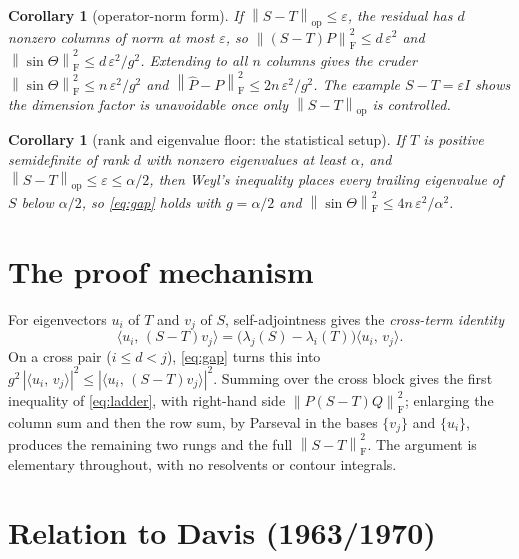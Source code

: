 \documentclass[11pt]{article}
\newcommand{\norm}[1]{\left\lVert #1\right\rVert}
\newcommand{\eps}{\varepsilon}
\newcommand{\F}{\mathrm{F}}
\newcommand{\op}{\mathrm{op}}
\newcommand{\inner}[2]{\langle #1,\,#2\rangle}
\newcommand{\gap}{g}
\newcommand{\sinT}{\sin\Theta}
\newtheorem{corollary}[theorem]{Corollary}
\theoremstyle{remark}
\begin{document}
\begin{corollary}[operator-norm form]\label{cor:opnorm}
If $\norm{S-T}_{\op}\le\eps$, the residual has $d$ nonzero columns of norm at most
$\eps$, so $\norm{(S-T)P}_{\F}^2\le d\,\eps^2$ and
$\norm{\sinT}_{\F}^2\le d\,\eps^2/\gap^2$.  Extending to all $n$ columns gives the
cruder $\norm{\sinT}_{\F}^2\le n\,\eps^2/\gap^2$ and
$\norm{\widehat P-P}_{\F}^2\le 2n\,\eps^2/\gap^2$.  The example $S-T=\eps I$ shows
the dimension factor is unavoidable once only $\norm{S-T}_{\op}$ is controlled.
\end{corollary}

\begin{corollary}[rank and eigenvalue floor: the statistical setup]\label{cor:floor}
If $T$ is positive semidefinite of rank $d$ with nonzero eigenvalues at least
$\alpha$, and $\norm{S-T}_{\op}\le\eps\le\alpha/2$, then Weyl's inequality places
every trailing eigenvalue of $S$ below $\alpha/2$, so \eqref{eq:gap} holds with
$\gap=\alpha/2$ and $\norm{\sinT}_{\F}^2\le 4n\,\eps^2/\alpha^2$.
\end{corollary}

\section{The proof mechanism}

For eigenvectors $u_i$ of $T$ and $v_j$ of $S$, self-adjointness gives the
\emph{cross-term identity}
\begin{equation}\label{eq:cross}
  \inner{u_i}{(S-T)v_j}=\bigl(\lambda_j(S)-\lambda_i(T)\bigr)\inner{u_i}{v_j}.
\end{equation}
On a cross pair ($i\le d<j$), \eqref{eq:gap} turns this into
$\gap^2\,|\inner{u_i}{v_j}|^2\le|\inner{u_i}{(S-T)v_j}|^2$.  Summing over the
cross block gives the first inequality of \eqref{eq:ladder}, with right-hand side
$\norm{P(S-T)Q}_{\F}^2$; enlarging the column sum and then the row sum, by
Parseval in the bases $\{v_j\}$ and $\{u_i\}$, produces the remaining two rungs
and the full $\norm{S-T}_{\F}^2$.  The argument is elementary throughout, with no
resolvents or contour integrals.

\section{Relation to Davis (1963/1970)}
\end{document}
